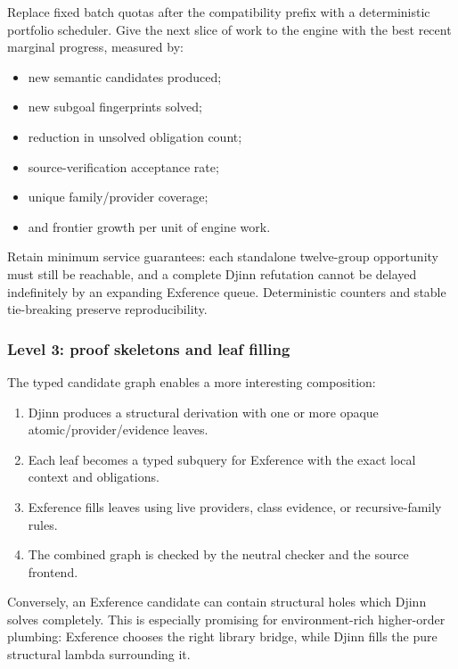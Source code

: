 \documentclass[11pt]{article}
\newcommand{\Djinn}{Djinn}
\newcommand{\Exference}{Exference}
\begin{document}
Replace fixed batch quotas after the compatibility prefix with a deterministic
portfolio scheduler.  Give the next slice of work to the engine with the best
recent marginal progress, measured by:

\begin{itemize}
  \item new semantic candidates produced;
  \item new subgoal fingerprints solved;
  \item reduction in unsolved obligation count;
  \item source-verification acceptance rate;
  \item unique family/provider coverage;
  \item and frontier growth per unit of engine work.
\end{itemize}

Retain minimum service guarantees: each standalone twelve-group opportunity
must still be reachable, and a complete \Djinn{} refutation cannot be delayed
indefinitely by an expanding \Exference{} queue.  Deterministic counters and
stable tie-breaking preserve reproducibility.

\subsubsection{Level 3: proof skeletons and leaf filling}

The typed candidate graph enables a more interesting composition:

\begin{enumerate}
  \item \Djinn{} produces a structural derivation with one or more opaque
    atomic/provider/evidence leaves.
  \item Each leaf becomes a typed subquery for \Exference{} with the exact
    local context and obligations.
  \item \Exference{} fills leaves using live providers, class evidence, or
    recursive-family rules.
  \item The combined graph is checked by the neutral checker and the source
    frontend.
\end{enumerate}

Conversely, an \Exference{} candidate can contain structural holes which
\Djinn{} solves completely.  This is especially promising for environment-rich
higher-order plumbing: \Exference{} chooses the right library bridge, while
\Djinn{} fills the pure structural lambda surrounding it.
\end{document}
